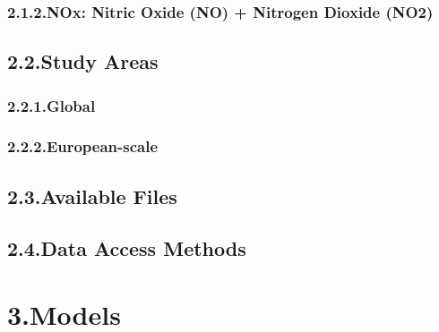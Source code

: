 \documentclass[9pt]{report}
\begin{document}
\subsubsection{2.1.2.\hspace*{0.5em}NOx: Nitric Oxide (NO) + Nitrogen Dioxide (NO2)}\label{sec-nosubxsub--nitric-oxide-no-nitrogen-dioxide-nosub2sub}%

\subsection{2.2.\hspace*{0.5em}Study Areas}\label{sec-study-areas}%

\subsubsection{2.2.1.\hspace*{0.5em}Global}\label{sec-global}%

\subsubsection{2.2.2.\hspace*{0.5em}European-scale}\label{sec-european-scale}%

\subsection{2.3.\hspace*{0.5em}Available Files}\label{sec-available-files}%

\subsection{2.4.\hspace*{0.5em}Data Access Methods}\label{sec-data-access-methods}%

\section{3.\hspace*{0.5em}Models}\label{sec-models}%
\end{document}
